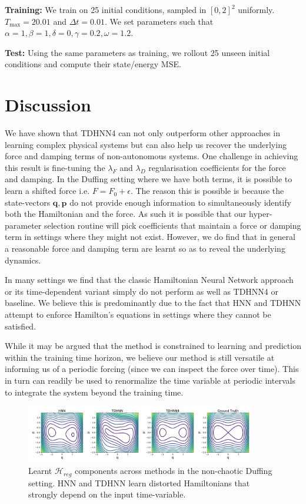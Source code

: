 \documentclass{article}
\begin{document}
\textbf{Training:} We train on 25 initial conditions, sampled in $[0,2]^2$ uniformly. $T_{\max} = 20.01$ and $\Delta t = 0.01$. We set parameters such that $\alpha =1, \beta =1,\delta =0,\gamma = 0.2,\omega = 1.2$.

\textbf{Test:} Using the same parameters as training, we rollout 25 unseen initial conditions and compute their state/energy MSE.

\section{Discussion}

We have shown that TDHNN4 can not only outperform other approaches in learning complex physical systems but can also help us recover the underlying force and damping terms of non-autonomous systems. One challenge in achieving this result is fine-tuning the $\lambda_F$ and $\lambda_D$ regularisation coefficients for the force and damping. In the Duffing setting where we have both terms, it is possible to learn a shifted force i.e. $F = F_0 + \epsilon$. The reason this is possible is because the state-vectors $\mathbf{q},\mathbf{p}$ do not provide enough information to simultaneously identify both the Hamiltonian and the force. As such it is possible that our hyper-parameter selection routine will pick coefficients that maintain a force or damping term in settings where they might not exist. However, we do find that in general a reasonable force and damping term are learnt so as to reveal the underlying dynamics.


In many settings we find that the classic Hamiltonian Neural Network approach or its time-dependent variant simply do not perform as well as TDHNN4 or baseline. We believe this is predominantly due to the fact that HNN and TDHNN attempt to enforce Hamilton's equations in settings where they cannot be satisfied.

While it may be argued that the method is constrained to learning and prediction within the training time horizon, we believe our method is still versatile at informing us of a periodic forcing (since we can inspect the force over time). This in turn can readily be used to renormalize the time variable at periodic intervals to integrate the system beyond the training time.
\begin{figure}[h]
\centering
\includegraphics[width=0.9\textwidth]{figures/duffing_ham_1.pdf}
\caption{Learnt $\mathcal{H}_{reg}$ components across methods in the non-chaotic Duffing setting. HNN and TDHNN learn distorted Hamiltonians that strongly depend on the input time-variable.}
\label{duffing_ham}
\end{figure}
\end{document}
